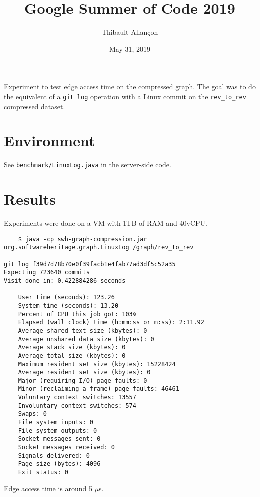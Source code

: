 \documentclass[11pt,a4paper]{article}
\title{Google Summer of Code 2019}
\author{Thibault Allançon}
\date{May 31, 2019}
\begin{document}
\maketitle

Experiment to test edge access time on the compressed graph. The goal was to do
the equivalent of a \texttt{git log} operation with a Linux commit on
the \texttt{rev_to_rev} compressed dataset.

\section{Environment}

See \texttt{benchmark/LinuxLog.java} in the server-side code.

\section{Results}

Experiments were done on a VM with 1TB of RAM and 40vCPU.

\begin{small}
\begin{verbatim}
    $ java -cp swh-graph-compression.jar org.softwareheritage.graph.LinuxLog /graph/rev_to_rev

git log f39d7d78b70e0f39facb1e4fab77ad3df5c52a35
Expecting 723640 commits
Visit done in: 0.422884286 seconds

    User time (seconds): 123.26
    System time (seconds): 13.20
    Percent of CPU this job got: 103%
    Elapsed (wall clock) time (h:mm:ss or m:ss): 2:11.92
    Average shared text size (kbytes): 0
    Average unshared data size (kbytes): 0
    Average stack size (kbytes): 0
    Average total size (kbytes): 0
    Maximum resident set size (kbytes): 15228424
    Average resident set size (kbytes): 0
    Major (requiring I/O) page faults: 0
    Minor (reclaiming a frame) page faults: 46461
    Voluntary context switches: 13557
    Involuntary context switches: 574
    Swaps: 0
    File system inputs: 0
    File system outputs: 0
    Socket messages sent: 0
    Socket messages received: 0
    Signals delivered: 0
    Page size (bytes): 4096
    Exit status: 0
\end{verbatim}
\end{small}

Edge access time is around 5 $\mu$s.
\end{document}
